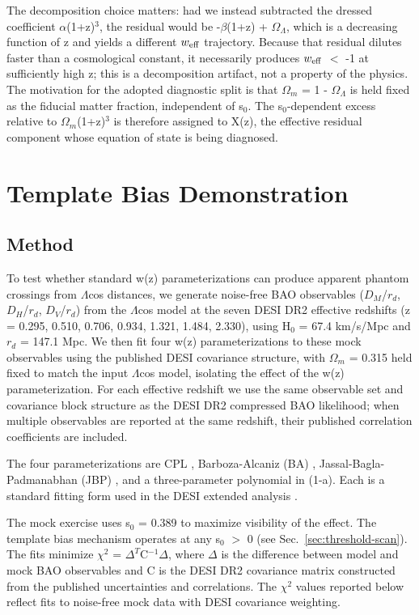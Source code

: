 The decomposition choice matters: had we instead subtracted the dressed
coefficient $\alpha$(1+z)$^3$, the residual would be -$\beta$(1+z) + $\Omega_\Lambda$, which is a
decreasing function of z and yields a different $w_{\rm eff}$ trajectory.
Because that residual dilutes faster than a cosmological constant, it
necessarily produces $w_{\rm eff}$ $<$ -1 at sufficiently high z; this
is a decomposition artifact, not a property of the physics. The
motivation for the adopted diagnostic split is that $\Omega_m$ = 1 - $\Omega_\Lambda$ is
held fixed as the fiducial matter fraction, independent of s$_0$. The
s$_0$-dependent excess relative to $\Omega_m$(1+z)$^3$ is therefore assigned to
X(z), the effective residual component whose equation of state is being
diagnosed.

\section{Template Bias Demonstration}\label{sec:template-bias}

\subsection{Method}\label{sec:tb-method}

To test whether standard w(z) parameterizations can produce apparent
phantom crossings from $\Lambda$cos distances, we generate noise-free BAO
observables ($D_M$/$r_d$, $D_H$/$r_d$, $D_V$/$r_d$) from the $\Lambda$cos model at the
seven DESI DR2 effective redshifts (z = 0.295, 0.510, 0.706, 0.934,
1.321, 1.484, 2.330), using H$_0$ = 67.4 km/s/Mpc and $r_d$ = 147.1 Mpc. We
then fit four w(z) parameterizations to these mock observables using the
published DESI covariance structure, with $\Omega_m$ = 0.315 held fixed to
match the input $\Lambda$cos model, isolating the effect of the w(z)
parameterization. For each effective redshift we use the same observable
set and covariance block structure as the DESI DR2 compressed BAO
likelihood; when multiple observables are reported at the same redshift,
their published correlation coefficients are included.

The four parameterizations are CPL \cite{ref4,ref5}, Barboza-Alcaniz (BA)
\cite{ref10}, Jassal-Bagla-Padmanabhan (JBP) \cite{ref11}, and a three-parameter
polynomial in (1-a). Each is a standard fitting form used in the DESI
extended analysis \cite{ref9}.

The mock exercise uses s$_0$ = 0.389 to maximize visibility of the effect.
The template bias mechanism operates at any s$_0$ $>$ 0 (see
Sec.~\ref{sec:threshold-scan}). The fits minimize $\chi^2$ = $\Delta^T$C$^{-1}\Delta$, where $\Delta$ is the difference between
model and mock BAO observables and C is the DESI DR2 covariance matrix
constructed from the published uncertainties and correlations. The $\chi^2$
values reported below reflect fits to noise-free mock data with DESI
covariance weighting.

